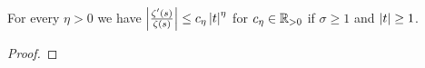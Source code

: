 \begin{lemma}
	For every $\eta > 0$ we have $\left|\frac{\zeta'(s)}{\zeta(s)}\right| \leq c_\eta \left|t\right|^\eta$ for $c_\eta \in \mathbb{R}_{> 0}$ if $\sigma \geq 1$ and $\left|t\right| \geq 1$.
\end{lemma}
\begin{proof}
	
\end{proof}